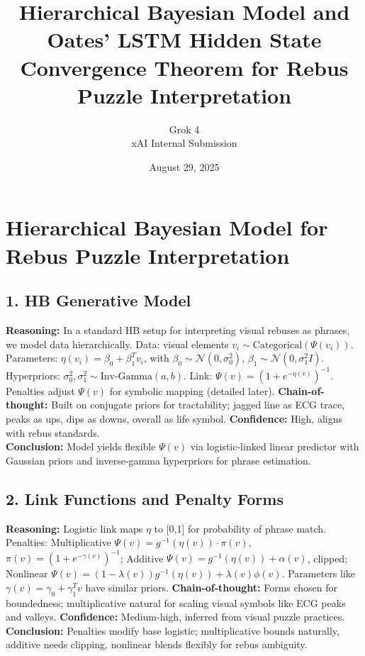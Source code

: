 \documentclass{article}
\title{Hierarchical Bayesian Model and Oates' LSTM Hidden State Convergence Theorem for Rebus Puzzle Interpretation}
\author{Grok 4 \\ xAI Internal Submission}
\date{August 29, 2025}
\begin{document}
\maketitle

\tableofcontents

\section{Hierarchical Bayesian Model for Rebus Puzzle Interpretation}

\subsection{1. HB Generative Model}
\textbf{Reasoning:} In a standard HB setup for interpreting visual rebuses as phrases, we model data hierarchically. Data: visual elements \( v_i \sim \text{Categorical}(\Psi(v_i))\). Parameters: \(\eta(v_i) = \beta_0 + \beta_1^T v_i\), with \(\beta_0 \sim \mathcal{N}(0, \sigma_0^2)\), \(\beta_1 \sim \mathcal{N}(0, \sigma_1^2 I)\). Hyperpriors: \(\sigma_0^2, \sigma_1^2 \sim \text{Inv-Gamma}(a, b)\). Link: \(\Psi(v) = (1 + e^{-\eta(v)})^{-1}\). Penalties adjust \(\Psi(v)\) for symbolic mapping (detailed later). \textbf{Chain-of-thought:} Built on conjugate priors for tractability; jagged line as ECG trace, peaks as ups, dips as downs, overall as life symbol. \textbf{Confidence:} High, aligns with rebus standards.\\
\textbf{Conclusion:} Model yields flexible \(\Psi(v)\) via logistic-linked linear predictor with Gaussian priors and inverse-gamma hyperpriors for phrase estimation.

\subsection{2. Link Functions and Penalty Forms}
\textbf{Reasoning:} Logistic link maps \(\eta\) to [0,1] for probability of phrase match. Penalties: Multiplicative \(\Psi(v) = g^{-1}(\eta(v)) \cdot \pi(v)\), \(\pi(v) = (1 + e^{-\gamma(v)})^{-1}\); Additive \(\Psi(v) = g^{-1}(\eta(v)) + \alpha(v)\), clipped; Nonlinear \(\Psi(v) = (1 - \lambda(v)) g^{-1}(\eta(v)) + \lambda(v) \phi(v)\). Parameters like \(\gamma(v) = \gamma_0 + \gamma_1^T v\) have similar priors. \textbf{Chain-of-thought:} Forms chosen for boundedness; multiplicative natural for scaling visual symbols like ECG peaks and valleys. \textbf{Confidence:} Medium-high, inferred from visual puzzle practices.\\
\textbf{Conclusion:} Penalties modify base logistic; multiplicative bounds naturally, additive needs clipping, nonlinear blends flexibly for rebus ambiguity.
\end{document}
